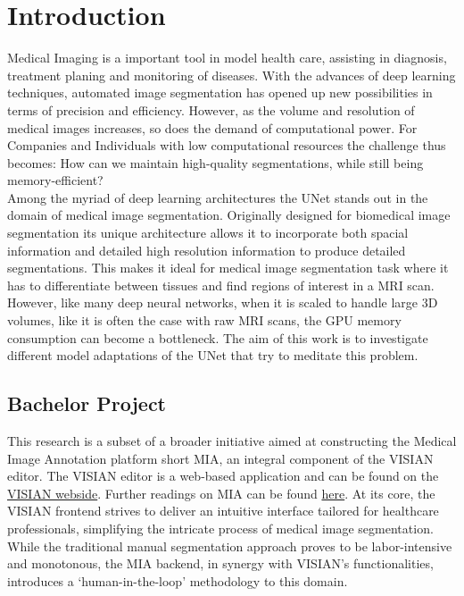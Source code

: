 \chapter{Introduction}
\noindent Medical Imaging is a important tool in model health care, assisting in diagnosis, treatment planing and monitoring of diseases.
With the advances of deep learning techniques, automated image segmentation has opened up new possibilities in terms of precision and efficiency.\cite[1-2]{zhou_review_2021}
However, as the volume and resolution of medical images increases, so does the demand of computational power.\cite[1]{wang_super-resolution_2023}
For Companies and Individuals with low computational resources the challenge thus becomes: How can we maintain high-quality segmentations, while still being memory-efficient?\\

\noindent Among the myriad of deep learning architectures the UNet stands out in the domain of medical image segmentation.
Originally designed for biomedical image segmentation its unique architecture allows it to incorporate both spacial information and detailed high resolution information to produce detailed segmentations.\cite{ronneberger_u-net_2015}
This makes it ideal for medical image segmentation task where it has to differentiate between tissues and find regions of interest in a MRI scan.
However, like many deep neural networks, when it is scaled to handle large 3D volumes, like it is often the case with raw MRI scans, the GPU memory consumption can become a bottleneck.
The aim of this work is to investigate different model adaptations of the UNet that try to meditate this problem.

\section{Bachelor Project}
This research is a subset of a broader initiative aimed at constructing the Medical Image Annotation platform short MIA, an integral component of the VISIAN editor.
The VISIAN editor is a web-based application and can be found on the \href{https://visian.org/}{VISIAN webside}. Further readings on MIA can be found \href{https://mia-ai.vercel.app/}{here}.
At its core, the VISIAN frontend strives to deliver an intuitive interface tailored for healthcare professionals, simplifying the intricate process of medical image segmentation.
While the traditional manual segmentation approach proves to be labor-intensive and monotonous, the MIA backend, in synergy with VISIAN's functionalities,
introduces a `human-in-the-loop' methodology to this domain.

